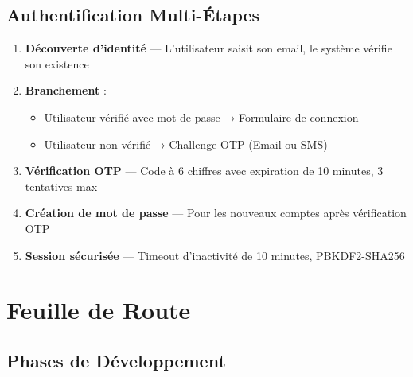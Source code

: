 \documentclass[12pt,a4paper,oneside]{report}
\begin{document}
\section{Authentification Multi-Étapes}

\begin{enumerate}
  \item \textbf{Découverte d'identité} — L'utilisateur saisit son email, le système vérifie son existence
  \item \textbf{Branchement} :
  \begin{itemize}
    \item Utilisateur vérifié avec mot de passe → Formulaire de connexion
    \item Utilisateur non vérifié → Challenge OTP (Email ou SMS)
  \end{itemize}
  \item \textbf{Vérification OTP} — Code à 6 chiffres avec expiration de 10 minutes, 3 tentatives max
  \item \textbf{Création de mot de passe} — Pour les nouveaux comptes après vérification OTP
  \item \textbf{Session sécurisée} — Timeout d'inactivité de 10 minutes, PBKDF2-SHA256
\end{enumerate}


\chapter{Feuille de Route}

\section{Phases de Développement}
\end{document}
